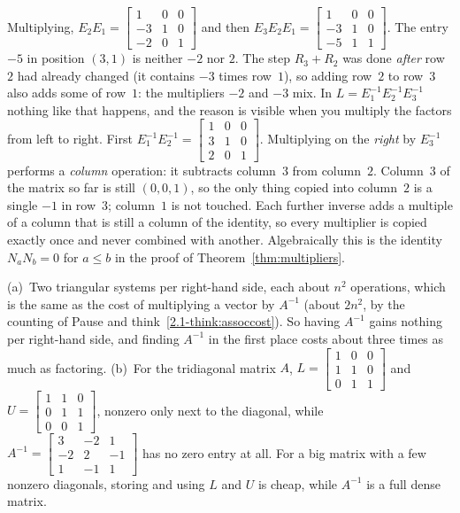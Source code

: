 \documentclass[11pt]{article}
\begin{document}
\begin{description}[leftmargin=0pt,itemsep=5pt]
  \item[Pause and think \ref{think:mixing}.] Multiplying, $E_2E_1=\begin{bmatrix}1&0&0\\-3&1&0\\-2&0&1\end{bmatrix}$ and then $E_3E_2E_1=\begin{bmatrix}1&0&0\\-3&1&0\\-5&1&1\end{bmatrix}$. The entry $-5$ in position $(3,1)$ is neither $-2$ nor $2$. The step $R_3+R_2$ was done \emph{after} row~$2$ had already changed (it contains $-3$ times row~$1$), so adding row~$2$ to row~$3$ also adds some of row~$1$: the multipliers $-2$ and $-3$ mix. In $L=E_1^{-1}E_2^{-1}E_3^{-1}$ nothing like that happens, and the reason is visible when you multiply the factors from left to right. First $E_1^{-1}E_2^{-1}=\begin{bmatrix}1&0&0\\3&1&0\\2&0&1\end{bmatrix}$. Multiplying on the \emph{right} by $E_3^{-1}$ performs a \emph{column} operation: it subtracts column~$3$ from column~$2$. Column~$3$ of the matrix so far is still $(0,0,1)$, so the only thing copied into column~$2$ is a single $-1$ in row~$3$; column~$1$ is not touched. Each further inverse adds a multiple of a column that is still a column of the identity, so every multiplier is copied exactly once and never combined with another. Algebraically this is the identity $N_aN_b=0$ for $a\le b$ in the proof of Theorem~\ref{thm:multipliers}.
  \item[Pause and think \ref{think:oncefactor}.] (a)~Two triangular systems per right-hand side, each about $n^2$ operations, which is the same as the cost of multiplying a vector by $A^{-1}$ (about $2n^2$, by the counting of Pause and think~\ref{2.1-think:assoccost}). So having $A^{-1}$ gains nothing per right-hand side, and finding $A^{-1}$ in the first place costs about three times as much as factoring. (b)~For the tridiagonal matrix $A$, $L=\begin{bmatrix}1&0&0\\1&1&0\\0&1&1\end{bmatrix}$ and $U=\begin{bmatrix}1&1&0\\0&1&1\\0&0&1\end{bmatrix}$, nonzero only next to the diagonal, while $A^{-1}=\begin{bmatrix}3&-2&1\\-2&2&-1\\1&-1&1\end{bmatrix}$ has no zero entry at all. For a big matrix with a few nonzero diagonals, storing and using $L$ and $U$ is cheap, while $A^{-1}$ is a full dense matrix.

\end{description}
\end{document}
